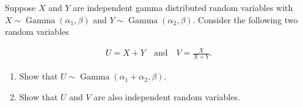 
\begin{exercise}[Transformations]

Suppose $X$ and $Y$ are independent gamma distributed random variables with $X \sim \operatorname{Gamma}(\alpha_1, \beta)$ and $Y \sim \operatorname{Gamma}(\alpha_2, \beta)$.
Consider the following two random variables

\begin{align*}
    U = X + Y
    \quad
    \text{and}
    \quad
    V = \frac{X}{X + Y}.
\end{align*}

\begin{enumerate}[label = (\alph*)]
    \item Show that $U \sim \operatorname{Gamma}(\alpha_1 + \alpha_2, \beta)$.
    \item Show that $U$ and $V$ are also independent random variables.
\end{enumerate}

\end{exercise}


